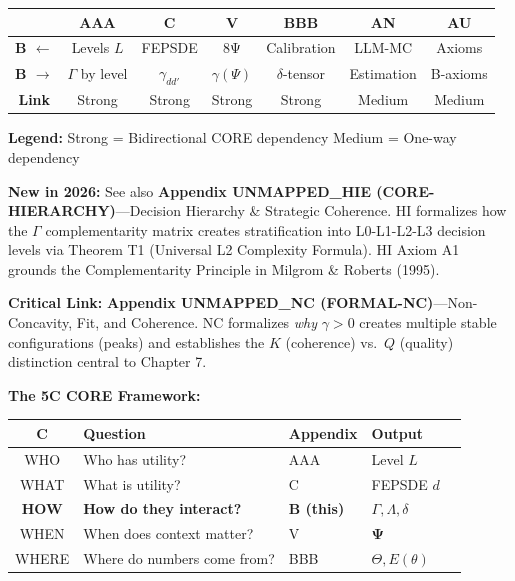 \begin{tcolorbox}[colback=white, colframe=black, 
    title=\textbf{Cross-Reference Map}]

\begin{center}
\small
\begin{tabular}{@{}c|cccccc@{}}
\toprule
& \textbf{AAA} & \textbf{C} & \textbf{V} & \textbf{BBB} & \textbf{AN} & \textbf{AU} \\
\midrule
\textbf{B $\leftarrow$} & Levels $L$ & FEPSDE & 8Ψ & Calibration & LLM-MC & Axioms \\
\textbf{B $\rightarrow$} & $\Gamma$ by level & $\gamma_{dd'}$ & $\gamma(\Psi)$ & $\delta$-tensor & Estimation & B-axioms \\
\midrule
\textbf{Link} & \cellcolor{red!20}Strong & \cellcolor{red!20}Strong & \cellcolor{red!20}Strong & \cellcolor{red!20}Strong & \cellcolor{yellow!20}Medium & \cellcolor{yellow!20}Medium \\
\bottomrule
\end{tabular}
\end{center}

\textbf{Legend:}
\colorbox{red!20}{Strong} = Bidirectional CORE dependency \quad
\colorbox{yellow!20}{Medium} = One-way dependency

\textbf{New in 2026:} See also \textbf{Appendix UNMAPPED_HIE (CORE-HIERARCHY)}---Decision Hierarchy \& Strategic Coherence. HI formalizes how the $\Gamma$ complementarity matrix creates stratification into L0-L1-L2-L3 decision levels via Theorem T1 (Universal L2 Complexity Formula). HI Axiom A1 grounds the Complementarity Principle in Milgrom \& Roberts (1995).

\textbf{Critical Link:} \textbf{Appendix UNMAPPED_NC (FORMAL-NC)}---Non-Concavity, Fit, and Coherence. NC formalizes \textit{why} $\gamma > 0$ creates multiple stable configurations (peaks) and establishes the $K$ (coherence) vs.\ $Q$ (quality) distinction central to Chapter 7.

\textbf{The 5C CORE Framework:}
\begin{center}
\begin{tabular}{@{}cllll@{}}
\toprule
\textbf{C} & \textbf{Question} & \textbf{Appendix} & \textbf{Output} \\
\midrule
WHO & Who has utility? & AAA & Level $L$ \\
WHAT & What is utility? & C & FEPSDE $d$ \\
\textbf{HOW} & \textbf{How do they interact?} & \textbf{B (this)} & $\Gamma, \Lambda, \delta$ \\
WHEN & When does context matter? & V & $\boldsymbol{\Psi}$ \\
WHERE & Where do numbers come from? & BBB & $\Theta, E(\theta)$ \\
\bottomrule
\end{tabular}
\end{center}

\end{tcolorbox}

